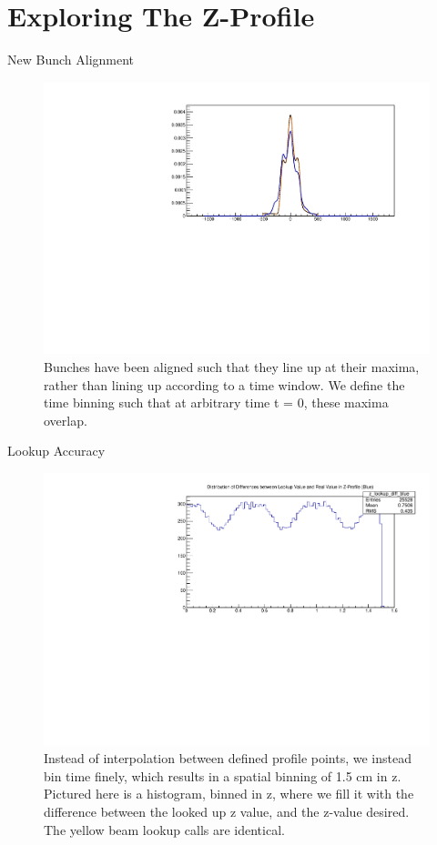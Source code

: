 \section{Exploring The Z-Profile}
\label{ch:ExploringZProfile}

\begin{frame}{New Bunch Alignment}
\begin{figure}
\begin{center}
\includegraphics[width=0.8\linewidth]{../ExploringZProfile/figs/359711_bunch_alignment.pdf}
\end{center}
\caption{Bunches have been aligned such that they line up at their maxima,
rather than lining up according to a time window. We define the time binning such
that at arbitrary time t = 0, these maxima overlap.}
\label{fig:359711_bunch_alignment}
\end{figure}
\end{frame}

\begin{frame}{Lookup Accuracy}
\begin{figure}
\begin{center}
\includegraphics[width=0.8\linewidth]{../ExploringZProfile/figs/359711_lookup_z.pdf}
\end{center}
\caption{Instead of interpolation between defined profile points, we instead bin
time finely, which results in a spatial binning of 1.5 cm in z. Pictured here
is a histogram, binned in z, where we fill it with the difference between the
looked up z value, and the z-value desired. The yellow beam lookup calls are
identical.}
\label{fig:359711_lookup_z}
\end{figure}
\end{frame}

